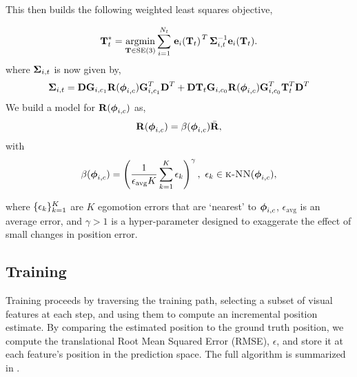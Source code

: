 This then builds the following weighted least squares objective,

\begin{equation}
\label{eq:vo_objective}
  \boldsymbol{\mathbf{T}}_t^* = \operatorname*{argmin}_{\boldsymbol{\mathbf{T}}\in\text{SE}(3)}\sum_{i=1}^{N_t} 
  \left.{\boldsymbol{\mathbf{e}}_{i}(\boldsymbol{\mathbf{T}}_t)}\right.^T \boldsymbol{\mathbf{\Sigma}}_{i,t}^{-1} \boldsymbol{\mathbf{e}}_{i}(\boldsymbol{\mathbf{T}}_t).
\end{equation}
where $\boldsymbol{\mathbf{\Sigma}}_{i,t}$ is now given by,
\begin{equation}
	\boldsymbol{\mathbf{\Sigma}}_{i,t} = \boldsymbol{\mathbf{D}}\boldsymbol{\mathbf{G}}_{i,c_1} \boldsymbol{\mathbf{R}}( \boldsymbol{\mathbf{\phi}}_{i,c})  \boldsymbol{\mathbf{G}}_{i,c_1}^T \boldsymbol{\mathbf{D}}^T + 
 \boldsymbol{\mathbf{D}}\boldsymbol{\mathbf{T}}_t \boldsymbol{\mathbf{G}}_{i,c_0} \boldsymbol{\mathbf{R}}( \boldsymbol{\mathbf{\phi}}_{i,c}) \boldsymbol{\mathbf{G}}_{i,c_0}^T  \boldsymbol{\mathbf{T}}_t^T \boldsymbol{\mathbf{D}}^T
\end{equation}
We build a model for $\boldsymbol{\mathbf{R}}( \boldsymbol{\mathbf{\phi}}_{i,c})$ as,
\begin{equation}
\boldsymbol{\mathbf{R}}( \boldsymbol{\mathbf{\phi}}_{i,c}) = \beta(\boldsymbol{\mathbf{\phi}}_{i,c}) \bar{\boldsymbol{\mathbf{R}}},
\end{equation}
with
\begin{equation}
 \beta(\boldsymbol{\mathbf{\phi}}_{i,c}) = \left(\frac{1}{\epsilon_\text{avg} K} \sum_{k=1}^K \epsilon_k  \right)^{\gamma}, ~ \epsilon_k \in \textsc{k-NN}(\boldsymbol{\mathbf{\phi}}_{i,c}),
\end{equation}

where $\{\epsilon_k\}_{k=1}^K$ are $K$ egomotion errors that are `nearest' to $\boldsymbol{\mathbf{\phi}}_{i,c}$, $\epsilon_\text{avg}$ is an average error, and $\gamma > 1$ is a hyper-parameter designed to exaggerate the effect of small changes in position error.

\subsection{Training}
Training proceeds by traversing the training path, selecting a subset of visual features at each step, and using them to compute an incremental position estimate. By comparing the estimated position to the ground truth position, we compute the translational Root Mean Squared Error (RMSE), $\epsilon$, and store it at each feature's position in the prediction space. The full algorithm is summarized in . 

